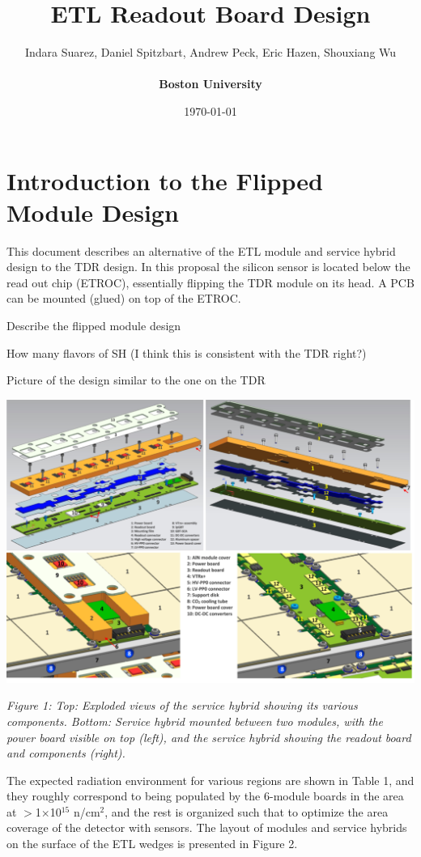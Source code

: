 \documentclass[11pt]{article}
\title{ETL Readout Board Design}
\author{Indara Suarez, Daniel Spitzbart, Andrew Peck, Eric Hazen, Shouxiang Wu
  \\
  \\ \Large{\textbf{Boston University}}}
\date{\today}
\begin{document}
\maketitle

\tableofcontents

\section{Introduction to the Flipped Module Design}

This document describes an alternative of the ETL module and service hybrid design to the TDR design. In this proposal the silicon sensor is located below the read out chip (ETROC), essentially flipping the TDR module on its head. A PCB can be mounted (glued) on top of the ETROC.

Describe the flipped module design

How many flavors of SH (I think this is consistent with the TDR right?)

Picture of the design similar to the one on the TDR

\includegraphics[width=\linewidth]{figures/image7.pdf}

\emph{Figure 1: Top: Exploded views of the service hybrid showing its various components. Bottom: Service hybrid mounted between two modules, with the power board visible on top (left), and the service hybrid showing the readout board and components (right).}

The expected radiation environment for various regions are shown in Table 1, and they roughly correspond to being populated by the 6-module boards in the area at $>$1$\times$10$^{15}$ n/cm$^{2}$, and the rest is organized such that to optimize the area coverage of the detector with sensors. The layout of modules and service hybrids on the surface of the ETL wedges is presented in Figure 2.
\end{document}
